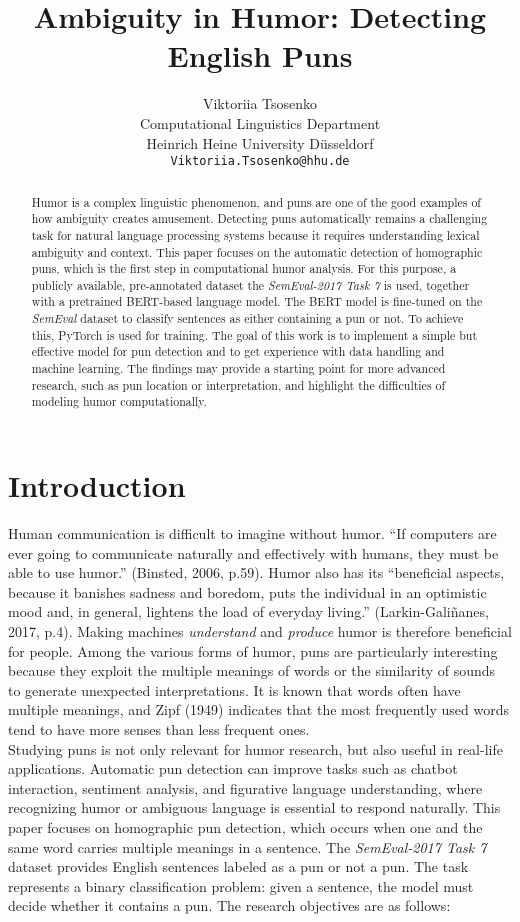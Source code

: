 \documentclass[10pt]{article}
\title{Ambiguity in Humor: Detecting English Puns}
\author{Viktoriia Tsosenko \\
Computational Linguistics Department\\
Heinrich Heine University D\"usseldorf\\
\texttt{Viktoriia.Tsosenko@hhu.de}
		}
\begin{document}
\maketitle

\begin{abstract}
Humor is a complex linguistic phenomenon, and puns are one of the good examples of how ambiguity creates amusement. Detecting puns automatically remains a challenging task for natural language processing systems because it requires understanding lexical ambiguity and context. This paper focuses on the automatic detection of homographic puns, which is the first step in computational humor analysis. For this purpose, a publicly available, pre-annotated dataset the \textit{SemEval-2017 Task 7} is used, together with a pretrained BERT-based language model. The BERT model is fine-tuned on the  \textit{SemEval} dataset to classify sentences as either containing a pun or not. To achieve this, PyTorch is used for training. The goal of this work is to implement a simple but effective model for pun detection and to get experience with data handling and machine learning.
The findings may provide a starting point for more advanced research, such as pun location or interpretation, and highlight the difficulties of modeling humor computationally.
\end{abstract}


\section{Introduction}

Human communication is difficult to imagine without humor. “If computers are ever going to communicate naturally and effectively with humans, they must be able to use humor.” (Binsted, 2006, p.59). Humor also has its “beneficial aspects, because it banishes sadness and boredom, puts the individual in an optimistic mood and, in general, lightens the load of everyday living.” (Larkin-Galiñanes, 2017, p.4). Making machines \textit{understand} and \textit{produce} humor is therefore beneficial for people. Among the various forms of humor, puns are particularly interesting because they exploit the multiple meanings of words or the similarity of sounds to generate unexpected interpretations. It is known that words often have multiple meanings, and Zipf (1949) indicates that the most frequently used words tend to have more senses than less frequent ones.\\[6pt]
Studying puns is not only relevant for humor research, but also useful in real-life applications. Automatic pun detection can improve tasks such as chatbot interaction, sentiment analysis, and figurative language understanding, where recognizing humor or ambiguous language is essential to respond naturally.
This paper focuses on homographic pun detection, which occurs when one and the same word carries multiple meanings in a sentence. The \textit{SemEval-2017 Task 7} dataset provides English sentences labeled as a pun or not a pun. The task represents a binary classification problem: given a sentence, the model must decide whether it contains a pun.
The research objectives are as follows:
\end{document}
